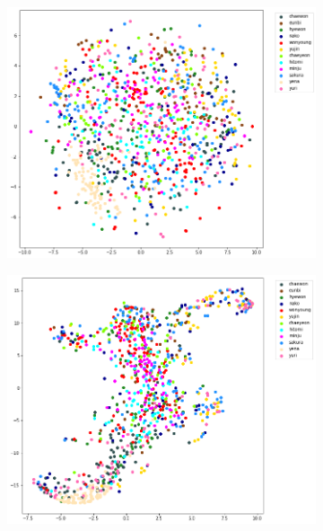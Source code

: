 \begin{enumerate}[left=0pt]
\begin{figure}[htbp]
    \centering

    \begin{subfigure}{0.325\textwidth}
        \centering
        \includegraphics[trim=25 20 100 0, clip, width=\textwidth]{images/faceReco/nn1-and-binary/tsne-1.png}     
    \end{subfigure}
    \hfill
    \begin{subfigure}{0.325\textwidth}
        \centering
        \includegraphics[trim=30 20 100 0, clip, width=\textwidth]{images/faceReco/nn1-and-binary/tsne-2.png}     

\end{subfigure}
\end{figure}
\end{enumerate}
